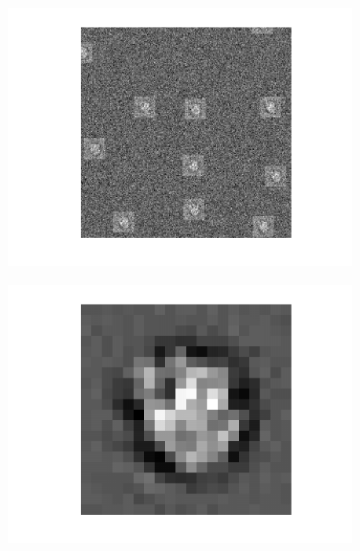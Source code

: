 \documentclass[english,11pt]{article}
\numberwithin{equation}{section}
\theoremstyle{plain}
\theoremstyle{definition}
\theoremstyle{remark}
\theoremstyle{plain}
\theoremstyle{remark}
\theoremstyle{plain}
\theoremstyle{plain}
\begin{document}
\begin{figure}
	\begin{subfigure}{.6\textwidth}
	\centering
	\includegraphics[scale=0.6]{data2D_noisy_02}
	\vspace*{-20pt}
	\caption{}
	\label{fig:data2D_noisy_02}
\end{subfigure}
\begin{subfigure}{.6\textwidth}
	\centering
	\includegraphics[scale=0.6]{signal2D_LS_all_images}
	\vspace*{-20pt}
	\caption{}
	\label{fig:signal2D_LS}
\end{subfigure}



\end{figure}
\end{document}
